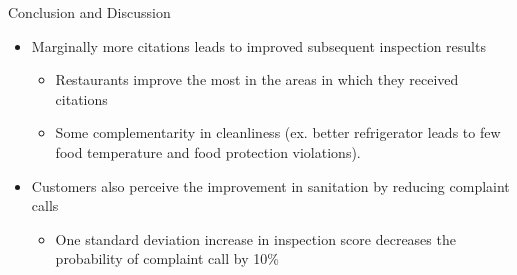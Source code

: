 \documentclass{beamer}
\begin{document}
\begin{frame}{Conclusion and Discussion}
\begin{itemize}
\item Marginally more citations leads to improved subsequent inspection results
\begin{itemize}
\item Restaurants improve the most in the areas in which they received citations  
\item Some complementarity in cleanliness (ex. better refrigerator leads to few food temperature and food protection violations). 
\end{itemize}
\item Customers also perceive the improvement in sanitation by reducing complaint calls
\begin{itemize}
\item One standard deviation increase in inspection score decreases the probability of complaint call by 10\%
\end{itemize}
\end{itemize}
\end{frame}
\end{document}
